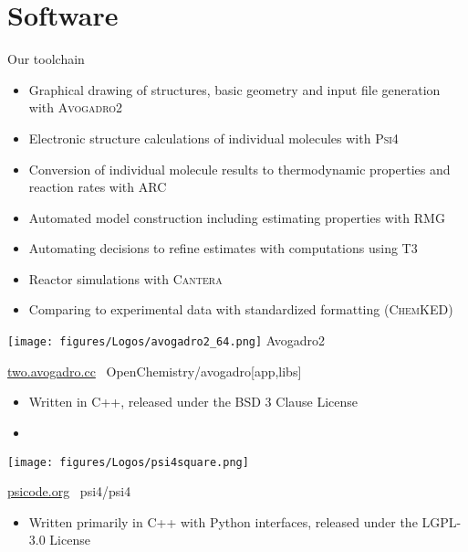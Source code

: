 \section{Software}

\begin{frame}{Our toolchain}
 \begin{itemize}
  \item Graphical drawing of structures, basic geometry and input file generation with \textsc{Avogadro2}
  \item Electronic structure calculations of individual molecules with \textsc{Psi4}
  \item Conversion of individual molecule results to thermodynamic properties and reaction rates with \textsc{ARC} %
  \item Automated model construction including estimating properties with \textsc{RMG}
  \item Automating decisions to refine estimates with computations using \textsc{T3}
  \item Reactor simulations with \textsc{Cantera}
  \item Comparing to experimental data with standardized formatting (\textsc{ChemKED})
 \end{itemize}
\end{frame}

\begin{frame}{
 \hspace{-5mm}
 \texttt{[image: figures/Logos/avogadro2\_64.png]}
 Avogadro2
}

\url{two.avogadro.cc}
\hspace{10mm}
\ghinlinelogo\ OpenChemistry/avogadro[app,libs]

\vspace{5mm}

 \begin{itemize}
 \item Written in C++, released under the BSD 3 Clause License
 \item 
\end{itemize}
\end{frame}

\begin{frame}{
 \hspace{-5mm}
 \texttt{[image: figures/Logos/psi4square.png]}
}

\url{psicode.org}
\hspace{10mm}
\ghinlinelogo\ psi4/psi4

\vspace{5mm}

\begin{itemize}
 \item Written primarily in C++ with Python interfaces, released under the LGPL-3.0 License
\end{itemize}
\end{frame}


